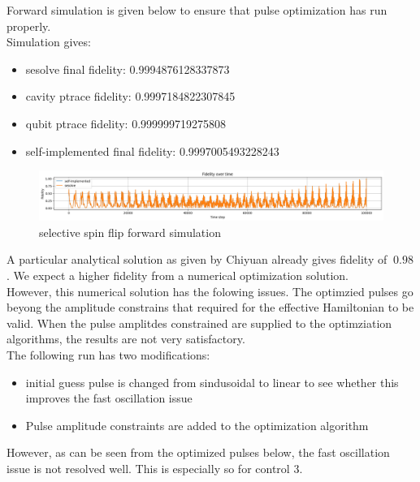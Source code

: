 \documentclass[12pt]{article}
\begin{document}
Forward simulation is given below to ensure that pulse optimization has run properly. 
\\
Simulation gives: 
\begin{itemize}
    \item sesolve final fidelity:  0.9994876128337873
    \item cavity ptrace fidelity:  0.9997184822307845
    \item qubit ptrace fidelity:  0.999999719275808
    \item self-implemented final fidelity:  0.9997005493228243
\end{itemize}
\begin{figure}[H]
    \centering
    \includegraphics[width=0.95\linewidth]{selective_spin_flip_GRAPE_simulation.png}
    \caption{selective spin flip forward simulation}
    \label{fig:selective_spin_flip_forward_simulation}
\end{figure}


A particular analytical solution as given by Chiyuan already gives fidelity of $~0.98$.
            We expect a higher fidelity from a numerical optimization solution. 
\\
However, this numerical solution has the folowing issues.
The optimzied pulses go beyong the amplitude constrains that required for the effective Hamiltonian to be valid. 
When the pulse amplitdes constrained are supplied to the optimziation algorithms, the results are not very satisfactory. 
\\
The following run has two modifications: 
\begin{itemize}
    \item initial guess pulse is changed from sindusoidal to linear to see whether this improves the fast oscillation issue
    \item Pulse amplitude constraints are added to the optimization algorithm
\end{itemize}
However, as can be seen from the optimized pulses below, the fast oscillation issue is not resolved well. 
This is especially so for control 3.
\\
\end{document}
